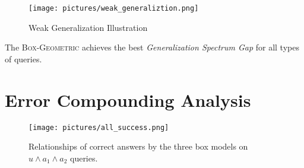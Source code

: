 
\begin{figure}[ht!]
  \centering
  \texttt{[image: pictures/weak\_generaliztion.png]}
  \caption{Weak Generalization Illustration}
  \label{fig:weak_generalization}
\end{figure}


The \textsc{Box-Geometric} achieves the best \textit{Generalization Spectrum Gap} for all types of queries.

\section{Error Compounding Analysis}
\label{app:error_compounding}

\begin{figure}[ht!]
    \centering
    \texttt{[image: pictures/all\_success.png]}
    \caption{Relationships of correct answers by the three box models on $u \wedge a_1 \wedge a_2$ queries.}
    \label{fig:first-figure}
\end{figure}

